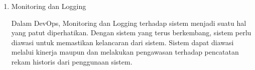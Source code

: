 \begin{enumerate}
  \item Monitoring dan Logging
  
  Dalam DevOps, Monitoring dan Logging terhadap sistem menjadi suatu hal yang patut diperhatikan.
  Dengan sistem yang terus berkembang, sistem perlu diawasi untuk memastikan kelancaran dari sistem.
  Sistem dapat diawasi melalui kinerja maupun dan melakukan pengawasan terhadap pencatatan rekam historis dari penggunaan sistem.

\end{enumerate}
